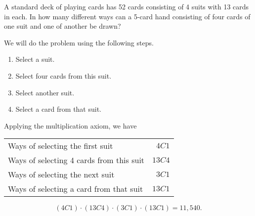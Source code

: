 \begin{example}
    A standard deck of playing cards has 52 cards consisting of 4 suits with 13 cards in each. In how many different ways can a 5-card hand consisting of four cards of one suit and one of another be drawn?
\end{example}
\begin{solution}
    We will do the problem using the following steps.
    \begin{enumerate}
        \item Select a suit.
        \item Select four cards from this suit.
        \item Select another suit.
        \item Select a card from that suit.
    \end{enumerate}
    Applying the multiplication axiom, we have
    \begin{center}
        \begin{tabular}{lr}
            Ways of selecting the first suit         & $4C1$  \\
            Ways of selecting 4 cards from this suit & $13C4$ \\
            Ways of selecting the next suit          & $3C1$  \\
            Ways of selecting a card from that suit  & $13C1$ \\
        \end{tabular}
    \end{center}
    \[
        (4C1) \cdot (13C4) \cdot (3C1) \cdot (13C1) = 11,540.
    \]
\end{solution}
